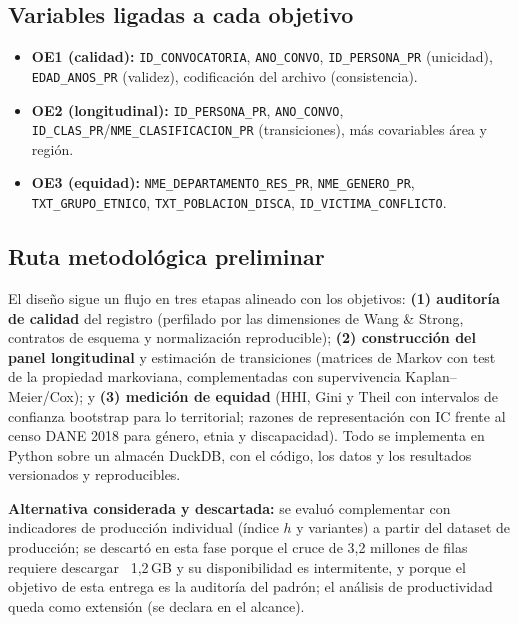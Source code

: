 \subsection{Variables ligadas a cada objetivo}

\begin{itemize}
  \item \textbf{OE1 (calidad):} \texttt{ID\_CONVOCATORIA}, \texttt{ANO\_CONVO},
        \texttt{ID\_PERSONA\_PR} (unicidad), \texttt{EDAD\_ANOS\_PR} (validez),
        codificación del archivo (consistencia).
  \item \textbf{OE2 (longitudinal):} \texttt{ID\_PERSONA\_PR},
        \texttt{ANO\_CONVO}, \texttt{ID\_CLAS\_PR}/\texttt{NME\_CLASIFICACION\_PR}
        (transiciones), más covariables área y región.
  \item \textbf{OE3 (equidad):} \texttt{NME\_DEPARTAMENTO\_RES\_PR},
        \texttt{NME\_GENERO\_PR}, \texttt{TXT\_GRUPO\_ETNICO},
        \texttt{TXT\_POBLACION\_DISCA}, \texttt{ID\_VICTIMA\_CONFLICTO}.
\end{itemize}

\subsection{Ruta metodológica preliminar}

El diseño sigue un flujo en tres etapas alineado con los objetivos:
\textbf{(1) auditoría de calidad} del registro (perfilado por las dimensiones
de Wang \& Strong, contratos de esquema y normalización reproducible);
\textbf{(2) construcción del panel longitudinal} y estimación de transiciones
(matrices de Markov con test de la propiedad markoviana, complementadas con
supervivencia Kaplan--Meier/Cox); y \textbf{(3) medición de equidad} (HHI,
Gini y Theil con intervalos de confianza bootstrap para lo territorial; razones
de representación con IC frente al censo DANE 2018 para género, etnia y
discapacidad). Todo se implementa en Python sobre un almacén DuckDB, con el
código, los datos y los resultados versionados y reproducibles.

\textbf{Alternativa considerada y descartada:} se evaluó complementar con
indicadores de producción individual (índice $h$ y variantes) a partir del
dataset de producción; se descartó en esta fase porque el cruce de 3,2
millones de filas requiere descargar ~1,2\,GB y su disponibilidad es
intermitente, y porque el objetivo de esta entrega es la auditoría del padrón;
el análisis de productividad queda como extensión (se declara en el alcance).

